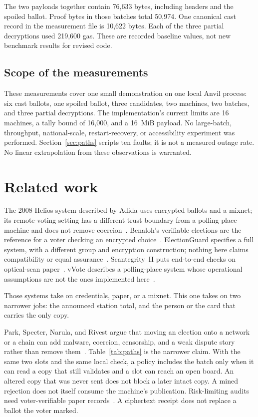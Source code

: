 \documentclass[11pt]{article}
\begin{document}
The two payloads together contain 76{,}633 bytes, including headers and the spoiled ballot. Proof bytes in those batches total 50{,}974. One canonical cast record in the measurement file is 10{,}622 bytes. Each of the three partial decryptions used 219{,}600 gas. These are recorded baseline values, not new benchmark results for revised code.

\subsection{Scope of the measurements}
These measurements cover one small demonstration on one local Anvil process: six cast ballots, one spoiled ballot, three candidates, two machines, two batches, and three partial decryptions. The implementation's current limits are 16 machines, a tally bound of 16{,}000, and a 16~MiB payload. No large-batch, throughput, national-scale, restart-recovery, or accessibility experiment was performed. Section~\ref{sec:paths} scripts ten faults; it is not a measured outage rate. No linear extrapolation from these observations is warranted.

\section{Related work}
The 2008 Helios system described by Adida uses encrypted ballots and a mixnet; its remote-voting setting has a different trust boundary from a polling-place machine and does not remove coercion~\cite{adida2008helios}. Benaloh's verifiable elections are the reference for a voter checking an encrypted choice~\cite{benaloh2006simple}. ElectionGuard specifies a full system, with a different group and encryption construction; nothing here claims compatibility or equal assurance~\cite{benaloh2024electionguard}. Scantegrity~II puts end-to-end checks on optical-scan paper~\cite{chaum2008scantegrity}. vVote describes a polling-place system whose operational assumptions are not the ones implemented here~\cite{culnane2015vvote}.

Those systems take on credentials, paper, or a mixnet. This one takes on two narrower jobs: the announced station total, and the person or the card that carries the only copy.

Park, Specter, Narula, and Rivest argue that moving an election onto a network or a chain can add malware, coercion, censorship, and a weak dispute story rather than remove them~\cite{park2021bad}. Table~\ref{tab:paths} is the narrower claim. With the same two slots and the same local check, a policy includes the batch only when it can read a copy that still validates and a slot can reach an open board. An altered copy that was never sent does not block a later intact copy. A mined rejection does not itself consume the machine's publication. Risk-limiting audits need voter-verifiable paper records~\cite{lindeman2012rla}. A ciphertext receipt does not replace a ballot the voter marked.
\end{document}

